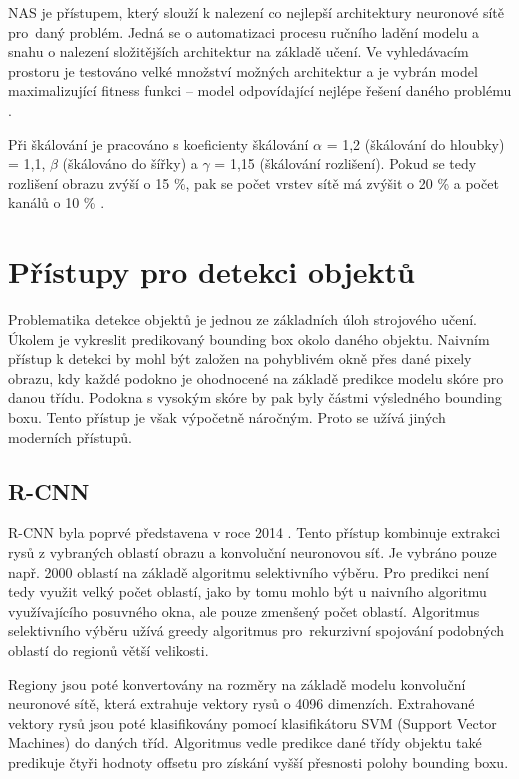 NAS je přístupem, který slouží k nalezení co nejlepší architektury neuronové sítě pro~daný problém. Jedná se o automatizaci procesu ručního ladění modelu a snahu o nalezení složitějších architektur na základě učení. Ve vyhledávacím prostoru je testováno velké množství možných architektur a je vybrán model maximalizující fitness funkci -- model odpovídající nejlépe řešení daného problému \cite{NAS}.

Při škálování je pracováno s koeficienty škálování $\alpha$ = 1,2 (škálování do hloubky) = 1,1, $\beta$ (škálováno do šířky) a $\gamma$ = 1,15 (škálování rozlišení). Pokud se tedy rozlišení obrazu zvýší o 15 \%, pak se počet vrstev sítě má zvýšit o 20 \% a počet kanálů o 10 \% \cite{EfficientNet, EfficientNetBlog}.


\section{Přístupy pro detekci objektů}
\label{sec:detekce}
Problematika detekce objektů je jednou ze základních úloh strojového učení. Úkolem je vykreslit predikovaný bounding box okolo daného objektu. Naivním přístup k detekci by mohl být založen na pohyblivém okně přes dané pixely obrazu, kdy každé podokno je ohodnocené na základě predikce modelu skóre pro danou třídu. Podokna s vysokým skóre by pak byly částmi výsledného bounding boxu. Tento přístup je však výpočetně náročným. Proto se užívá jiných moderních přístupů. 
\subsection*{R-CNN}
R-CNN byla poprvé představena v roce 2014 \cite{RCNN}. Tento přístup kombinuje extrakci rysů z vybraných oblastí obrazu a konvoluční neuronovou síť. Je vybráno pouze např. 2000 oblastí na základě algoritmu selektivního výběru. Pro predikci není tedy využit velký počet oblastí, jako by tomu mohlo být u naivního algoritmu využívajícího posuvného okna, ale pouze zmenšený počet oblastí. Algoritmus selektivního výběru užívá greedy algoritmus pro~rekurzivní spojování podobných oblastí do regionů větší velikosti. 

Regiony jsou poté konvertovány na rozměry na základě modelu konvoluční neuronové sítě, která extrahuje vektory rysů o 4096 dimenzích. Extrahované vektory rysů jsou poté klasifikovány pomocí klasifikátoru SVM (Support Vector Machines) do daných tříd. Algoritmus vedle predikce dané třídy objektu také predikuje čtyři hodnoty offsetu pro získání vyšší přesnosti polohy bounding boxu.


